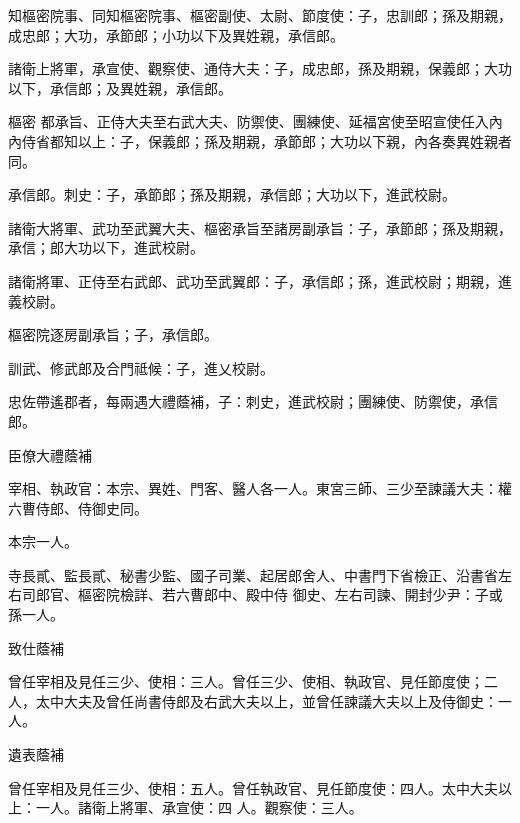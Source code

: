 \begin{pinyinscope}
 知樞密院事、同知樞密院事、樞密副使、太尉、節度使：子，忠訓郎；孫及期親，成忠郎；大功，承節郎；小功以下及異姓親，承信郎。



 諸衛上將軍，承宣使、觀察使、通侍大夫：子，成忠郎，孫及期親，保義郎；大功以下，承信郎；及異姓親，承信郎。



 樞密
 都承旨、正侍大夫至右武大夫、防禦使、團練使、延福宮使至昭宣使任入內內侍省都知以上：子，保義郎；孫及期親，承節郎；大功以下親，內各奏異姓親者同。



 承信郎。刺史：子，承節郎；孫及期親，承信郎；大功以下，進武校尉。



 諸衛大將軍、武功至武翼大夫、樞密承旨至諸房副承旨：子，承節郎；孫及期親，承信；郎大功以下，進武校尉。



 諸衛將軍、正侍至右武郎、武功至武翼郎：子，承信郎；孫，進武校尉；期親，進義校尉。



 樞密院逐房副承旨；子，承信郎。



 訓武、修武郎及合門祗候：子，進乂校尉。



 忠佐帶遙郡者，每兩遇大禮蔭補，子：刺史，進武校尉；團練使、防禦使，承信郎。



 臣僚大禮蔭補



 宰相、執政官：本宗、異姓、門客、醫人各一人。東宮三師、三少至諫議大夫：權六曹侍郎、侍御史同。



 本宗一人。



 寺長貳、監長貳、秘書少監、國子司業、起居郎舍人、中書門下省檢正、沿書省左右司郎官、樞密院檢詳、若六曹郎中、殿中侍
 御史、左右司諫、開封少尹：子或孫一人。



 致仕蔭補



 曾任宰相及見任三少、使相：三人。曾任三少、使相、執政官、見任節度使；二人，太中大夫及曾任尚書侍郎及右武大夫以上，並曾任諫議大夫以上及侍御史：一人。



 遺表蔭補



 曾任宰相及見任三少、使相：五人。曾任執政官、見任節度使：四人。太中大夫以上：一人。諸衛上將軍、承宣使：四
 人。觀察使：三人。



\end{pinyinscope}